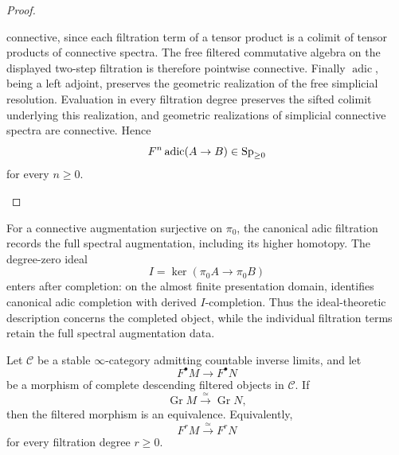 \begin{proof}
\begin{enumerate}[label=\textup{(\arabic*)}]
    connective, since each filtration term of a tensor product is a colimit of
    tensor products of connective spectra. The free filtered commutative algebra
    on the displayed two-step filtration is therefore pointwise connective.
    Finally \(\operatorname{adic}\), being a left adjoint, preserves the geometric
    realization of the free simplicial resolution. Evaluation in every
    filtration degree preserves the sifted colimit underlying this realization,
    and geometric realizations of simplicial connective spectra are connective.
    Hence
    \[
        F^n\operatorname{adic}(A\to B)\in\operatorname{Sp}_{\geq0}
    \]
    for every \(n\geq0\).
\end{enumerate}
\end{proof}


\begin{remark}
\label{rem:adic-degree-zero-ideal-comparison}
For a connective augmentation surjective on \(\pi_0\), the canonical adic
filtration records the full spectral augmentation, including its higher
homotopy. The degree-zero ideal
\[
    I=\ker(\pi_0A\to\pi_0B)
\]
enters after completion: on the almost finite presentation domain,
 identifies canonical adic completion with
derived \(I\)-completion. Thus the ideal-theoretic description concerns the completed object, while the
individual filtration terms retain the full spectral augmentation data.
\end{remark}

\begin{lemma}
\label{lem:complete-filtered-detection}
Let \(\mathcal C\) be a stable \(\infty\)-category admitting countable inverse
limits, and let
\[
    F^\bullet M\longrightarrow F^\bullet N
\]
be a morphism of complete descending filtered objects in \(\mathcal C\). If
\[
    \operatorname{Gr}M
    \xrightarrow{\simeq}
    \operatorname{Gr}N,
\]
then the filtered morphism is an equivalence. Equivalently,
\[
    F^rM\xrightarrow{\simeq}F^rN
\]
for every filtration degree \(r\geq0\).
\end{lemma}

